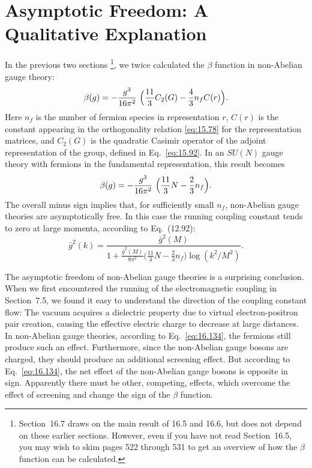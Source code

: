 \section{Asymptotic Freedom: A Qualitative Explanation}

In the previous two sections%
\footnote{Section~16.7 draws on the main result of 16.5 and 16.6, but does
not depend on these earlier sections.  However, even if you have not read
Section~16.5, you may wish to skim pages 522 through 531 to get an overview
of how the $\beta$ function can be calculated.}, we twice calculated the
$\beta$ function in non-Abelian gauge theory:
\begin{equation}
  \beta(g) = -\frac{g^3}{16\pi^2}\ \Bigl( \frac{11}{3}C_2(G)
    - \frac{4}{3}n_fC(r) \Bigr) .
  \label{eq:16.134}
\end{equation}
Here $n_f$ is the number of fermion species in representation $r$, $C(r)$ is
the constant appearing in the orthogonality relation \eqref{eq:15.78} for the
representation matrices, and $C_2(G)$ is the quadratic Casimir operator of
the adjoint representation of the group, defined in Eq.~\eqref{eq:15.92}.  In
an $SU(N)$ gauge theory with fermions in the fundamental representation, this
result becomes
\begin{equation}
  \beta(g) = -\frac{g^3}{16\pi^2}\ \Bigl( \frac{11}{3}N
    - \frac{2}{3}n_f \Bigr) .
  \label{eq:16.135}
\end{equation}
The overall minus sign implies that, for sufficiently small $n_f$, non-Abelian
gauge theories are asymptotically free.  In this case the running coupling
constant tends to zero at large momenta, according to Eq.~(12.92):
\begin{equation}
  \bar{g}^2(k) = \frac{\bar{g}^2(M)}{1 +
    \frac{\bar{g}^2(M)}{8\pi^2}\bigl( \frac{11}{3}N - \frac{2}{3}n_f
      \bigr)\log(k^2/M^2)} .
  \label{eq:16.136}
\end{equation}

The asymptotic freedom of non-Abelian gauge theories is a surprising
conclusion.  When we first encountered the running of the electromagnetic
coupling in Section~7.5, we found it easy to understand the direction of the
coupling constant flow: The vacuum acquires a dielectric property due to
virtual electron-positron pair creation, causing the effective electric charge
to decrease at large distances.  In non-Abelian gauge theories, according to
Eq.~\eqref{eq:16.134}, the fermions still produce such an effect.
Furthermore, since the non-Abelian gauge bosons are charged, they should
produce an additional screening effect.  But according to Eq.~\eqref{eq:16.134},
the net effect of the non-Abelian gauge bosons is opposite in sign.
Apparently there must be other, competing, effects, which overcome the effect
of screening and change the sign of the $\beta$ function.

